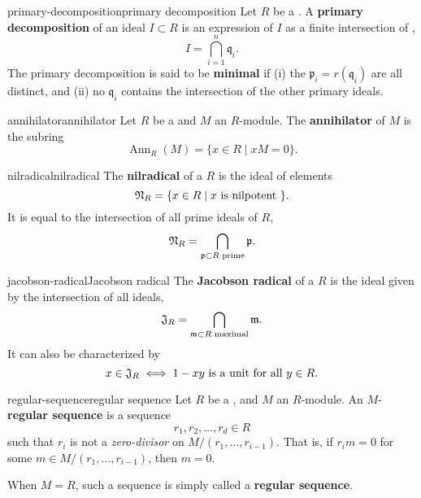 \begin{topic}{primary-decomposition}{primary decomposition}
    Let $R$ be a . A \textbf{primary decomposition} of an ideal $I \subset R$ is an expression of $I$ as a finite intersection of ,
    \[ I = \bigcap_{i = 1}^{n} \mathfrak{q}_i . \]
    The primary decomposition is said to be \textbf{minimal} if (i) the $\mathfrak{p}_i = r(\mathfrak{q}_i)$ are all distinct, and (ii) no $\mathfrak{q}_i$ contains the intersection of the other primary ideals.
\end{topic}

\begin{topic}{annihilator}{annihilator}
    Let $R$ be a  and $M$ an $R$-module. The \textbf{annihilator} of $M$ is the subring
    \[ \operatorname{Ann}_R(M) = \{ x \in R \mid xM = 0 \} . \]
\end{topic}

\begin{topic}{nilradical}{nilradical}
     The \textbf{nilradical} of a  $R$ is the ideal of  elements
     \[ \mathfrak{N}_R = \{ x \in R \mid x \textup{ is nilpotent } \} . \]
     It is equal to the intersection of all prime ideals of $R$,
     \[ \mathfrak{N}_R = \bigcap_{\mathfrak{p} \subset R \textup{ prime}} \mathfrak{p} . \]
\end{topic}

\begin{topic}{jacobson-radical}{Jacobson radical}
     The \textbf{Jacobson radical} of a  $R$ is the ideal given by the intersection of all  ideals,
     \[ \mathfrak{J}_R = \bigcap_{\mathfrak{m} \subset R \textup{ maximal}} \mathfrak{m} . \]
     It can also be characterized by
     \[ x \in \mathfrak{J}_R \iff 1 - xy \textup{ is a unit for all } y \in R . \]
\end{topic}

\begin{topic}{regular-sequence}{regular sequence}
    Let $R$ be a , and $M$ an $R$-module. An $M$-\textbf{regular sequence} is a sequence
    \[ r_1, r_2, \ldots, r_d \in R \]
    such that $r_i$ is not a \textit{zero-divisor} on $M/(r_1, \ldots, r_{i - 1})$. That is, if $r_i m = 0$ for some $m \in M / (r_1, \ldots, r_{i - 1})$, then $m = 0$.
    
    When $M = R$, such a sequence is simply called a \textbf{regular sequence}.
\end{topic}

